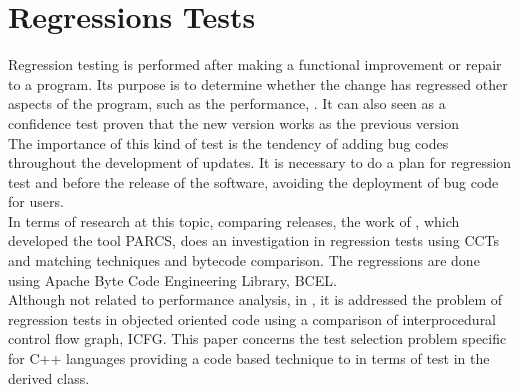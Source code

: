 \section{Regressions Tests}
Regression testing is performed after making a functional improvement or repair to a program. Its purpose is to determine whether the change has regressed other aspects of the program, such as the performance, \cite{book_testing}. It can also seen as a confidence test proven that the new version works as the previous version\\
The importance of this kind of test is the tendency of adding bug codes throughout the development of updates. It is necessary to do a plan for regression test and before the release of the software, avoiding the deployment of bug code for users.\\
In terms of research at this topic, comparing releases, the work of \cite{parcs}, which developed the tool PARCS, does an investigation in regression tests using CCTs and matching techniques and bytecode comparison. The regressions are done using Apache Byte Code Engineering Library, BCEL. \\
Although not related to performance analysis, in \cite{book_testing}, it is addressed the problem of regression tests in objected oriented code using a comparison of interprocedural control flow graph, ICFG. This paper concerns the test selection problem specific for C++ languages providing a code based technique to in terms of test in the derived class.
